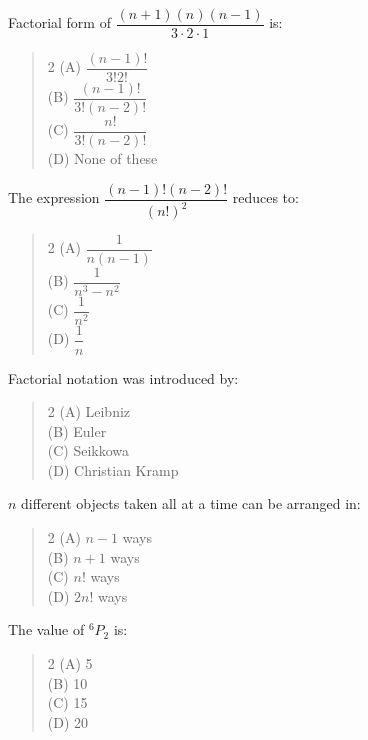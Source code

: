 \documentclass[11pt,a4paper]{article}
\begin{document}
\begin{mcqlist}
\item Factorial form of $\dfrac{(n+1)(n)(n-1)}{3\cdot2\cdot1}$ is:
\begin{quote}\begin{multicols}{2}
\noindent (A) $\dfrac{(n-1)!}{3!2!}$ \\
(B) $\dfrac{(n-1)!}{3!(n-2)!}$ \\
(C) $\dfrac{n!}{3!(n-2)!}$ \\
(D) None of these
\end{multicols}\end{quote}

\item The expression $\dfrac{(n-1)!(n-2)!}{(n!)^2}$ reduces to:
\begin{quote}\begin{multicols}{2}
\noindent (A) $\dfrac{1}{n(n-1)}$ \\
(B) $\dfrac{1}{n^3-n^2}$ \\
(C) $\dfrac{1}{n^2}$ \\
(D) $\dfrac{1}{n}$
\end{multicols}\end{quote}

\item Factorial notation was introduced by:
\begin{quote}\begin{multicols}{2}
\noindent (A) Leibniz \\
(B) Euler \\
(C) Seikkowa \\
(D) Christian Kramp
\end{multicols}\end{quote}

\item $n$ different objects taken all at a time can be arranged in:
\begin{quote}\begin{multicols}{2}
\noindent (A) $n-1$ ways \\
(B) $n+1$ ways \\
(C) $n!$ ways \\
(D) $2n!$ ways
\end{multicols}\end{quote}

\item The value of $^6P_2$ is:
\begin{quote}\begin{multicols}{2}
\noindent (A) 5 \\
(B) 10 \\
(C) 15 \\
(D) 20
\end{multicols}\end{quote}


\end{mcqlist}
\end{document}
